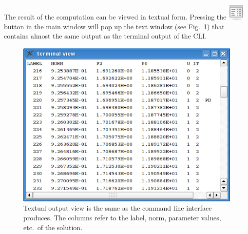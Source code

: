 \documentclass[10pt,a4paper]{ddedoc}
\newcommand{\iconText}{\protect\includegraphics[height=0.8\baselineskip]{fig/cr32-action-view_text}}
\begin{document}
The result of the computation can be viewed in textual form. Pressing the
 \iconText{} button in the main window
will pop up the text window (see Fig.\ \ref{textwindow}) that contains almost
the same output as the terminal output of the CLI.
\begin{figure}
\begin{center}
\includegraphics[scale=0.5]{fig/textwindow}
\caption{Textual output view is the same as the command line interface produces. The columns refer to the label,
norm, parameter values, etc.\ of the solution.}
\label{textwindow}
\end{center}
\end{figure}
\end{document}
